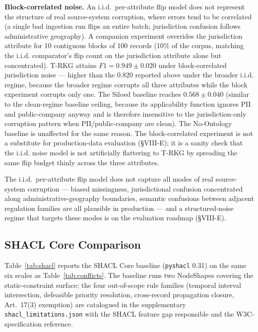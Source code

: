 \documentclass{ieeeaccess}
\begin{document}
\textbf{Block-correlated noise.} An i.i.d.\ per-attribute flip model does not represent the structure of real source-system corruption, where errors tend to be correlated (a single bad ingestion run flips an entire batch; jurisdiction confusion follows administrative geography). A companion experiment overrides the jurisdiction attribute for 10 contiguous blocks of 100 records (10\% of the corpus, matching the i.i.d. comparator's flip count on the jurisdiction attribute alone but concentrated). T-RKG attains $F1 = 0.949 \pm 0.020$ under block-correlated jurisdiction noise --- higher than the 0.820 reported above under the broader i.i.d. regime, because the broader regime corrupts all three attributes while the block experiment corrupts only one. The Siloed baseline reaches $0.568 \pm 0.040$ (similar to the clean-regime baseline ceiling, because its applicability function ignores PII and public-company anyway and is therefore insensitive to the jurisdiction-only corruption pattern when PII/public-company are clean). The No-Ontology baseline is unaffected for the same reason. The block-correlated experiment is not a substitute for production-data evaluation (§VIII-E); it is a sanity check that the i.i.d. noise model is not artificially flattering to T-RKG by spreading the same flip budget thinly across the three attributes.

The i.i.d.\ per-attribute flip model does not capture all modes of real source-system corruption --- biased missingness, jurisdictional confusion concentrated along administrative-geography boundaries, semantic confusions between adjacent regulation families are all plausible in production --- and a structured-noise regime that targets these modes is on the evaluation roadmap (§VIII-E).

\subsection{SHACL Core Comparison}
\label{sec:shacl}

Table~\ref{tab:shacl} reports the SHACL Core baseline (\texttt{pyshacl} 0.31) on the same six scales as Table~\ref{tab:conflicts}. The baseline runs two NodeShapes covering the static-constraint surface; the four out-of-scope rule families (temporal interval intersection, defeasible priority resolution, cross-record propagation closure, Art.~17(3) exemption) are catalogued in the supplementary \texttt{shacl\_limitations.json} with the SHACL feature gap responsible and the W3C-specification reference.
\end{document}
